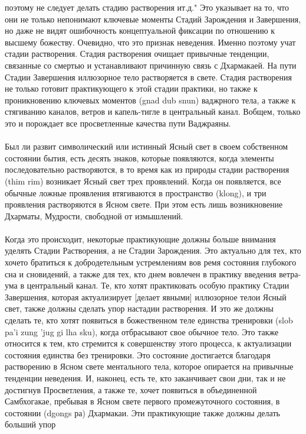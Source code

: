 \begin{siderules}
поэтому не следует делать стадию растворения ит.д." Это указывает на то, что они не только
непонимают ключевые моменты Стадий Зарождения и Завершения, но даже не видят
ошибочность концептуальной фиксации по отношению к высшему божеству. Очевидно, что
это признак неведения. Именно поэтому учат стадии растворения.
Стадия растворения очищает привычные тенденции, связанные со смертью и устанавливают
причинную связь с Дхармакаей. На пути Стадии Завершения иллюзорное тело растворяется
в свете. Стадия растворения не только готовит практикующего к этой стадии практики, но
также к проникновению ключевых моментов (gnad dub snun) ваджрного тела, а также к
стягиванию каналов, ветров и капель-тигле в центральный канал. Вобщем, только это и
порождает все просветленные качества пути Ваджраяны.\\
\\
Был ли развит символический или истинный Ясный свет в своем собственном состоянии
бытия, есть десять знаков, которые появляются, когда элементы последовательно
растворяются, в то время как из природы стадии растворения (thim rim) возникает Ясный
свет трех проявлений. Когда он появляется, все обычные ложные проявления втягиваются в
пространство (klong), и три проявления растворяются в Ясном свете. При этом есть лишь
возникновение Дхарматы, Мудрости, свободной от измышлений.\\
\\
Когда это происходит, некоторые практикующие должны больше внимания уделять Стадии
Растворения, а не Стадии Зарождения. Это актуально для тех, кто хочето братиться к
добродетельным устремлениям вов ремя состояния глубокого сна и сновидений, а также для
тех, кто днем вовлечен в практику введения ветра-ума в центральный канал. Те, кто хотят
практиковать особую практику Стадии Завершения, которая актуализирует [делает явными]
иллюзорное телои Ясный свет, также должны сделать упор настадии растворения. И это же
должны сделать те, кто хотят появиться в божественном теле единства тренировки (slob pa'i
zung 'jug gi lha sku), когда отбрасывают свое обычное тело. Это также относится к тем, кто
стремится к совершенству этого процесса, к актуализации состояния единства без
тренировки. Это состояние достигается благодаря растворению в Ясном свете ментального
тела, которое опирается на привычные тенденции неведения. И, наконец, есть те, кто
заканчивает свои дни, так и не достигнув Просветления, а также те, хочет появиться в
объединенной Самбхогакае, пребывая в Ясном свете первого промежуточного состояния, в
состоянии (dgongs ра) Дхармакаи. Эти практикующие также должны делать больший упор

\end{siderules}

